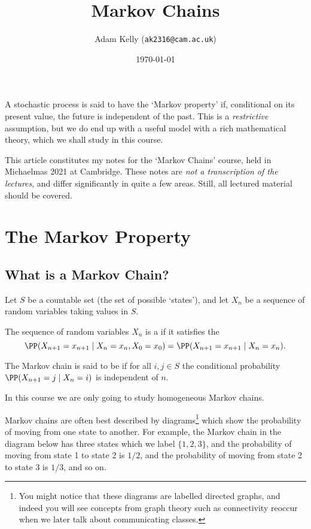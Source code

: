 \documentclass[a4paper]{scrartcl}
\title{Markov Chains}
\author{Adam Kelly (\texttt{ak2316@cam.ac.uk})}
\date{\today}
\begin{document}
\maketitle

A stochastic process is said to have the `Markov property' if, conditional on its present value, the future is independent of the past.
This is a \emph{restrictive} assumption, but we do end up with a useful model with a rich mathematical theory, which we shall study in this course.

This article constitutes my notes for the `Markov Chains' course, held in Michaelmas 2021 at Cambridge. These notes are \emph{not a transcription of the lectures}, and differ significantly in quite a few areas. Still, all lectured material should be covered.


\tableofcontents


\section{The Markov Property}

\subsection{What is a Markov Chain?}

Let $S$ be a countable set (the set of possible `states'), and let $X_n$ be a sequence of random variables taking values in $S$.

\begin{definition}
	The sequence of random variables $X_n$ is a  if it satisfies the 
	$$
	\PP(X_{n + 1} = x_{n + 1} \mid X_n = x_n, X_0 = x_0) = \PP(X_{n + 1} = x_{n + 1} \mid X_n = x_n).
	$$

	The Markov chain is said to be  if for all $i, j \in S$ the conditional probability $\PP(X_{n + 1} = j \mid X_n = i)$ is independent of $n$.
\end{definition}

In this course we are only going to study homogeneous Markov chains.

Markov chains are often best described by diagrams\footnote{You might notice that these diagrams are labelled directed graphs, and indeed you will see concepts from graph theory such as connectivity reoccur when we later talk about communicating classes.} which show the probability of moving from one state to another.
For example, the Markov chain in the diagram below has three states which we label $\{1, 2, 3\}$, and the probability of moving from state 1 to state 2 is $1/2$, and the probability of moving from state 2 to state 3 is $1/3$, and so on.
\end{document}

